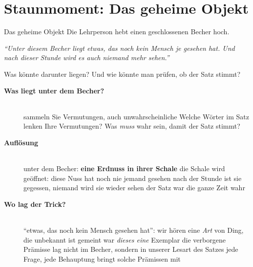 \section{Staunmoment: Das geheime Objekt}
\begin{staunbox}{Das geheime Objekt}
Die Lehrperson hebt einen geschlossenen Becher hoch.

\medskip
\emph{\enquote{Unter diesem Becher liegt etwas, das noch kein Mensch je
gesehen hat. Und nach dieser Stunde wird es auch niemand mehr sehen.}}

\medskip
Was könnte darunter liegen? Und wie könnte man prüfen, ob der Satz
stimmt?
\end{staunbox}
\os{\newpage}

\begin{description}
\item[{\rot\bf Was liegt unter dem Becher?}]~\\[-\lblskip]
\bi
  \ite sammeln Sie Vermutungen, auch unwahrscheinliche
  \ite Welche Wörter im Satz lenken Ihre Vermutungen?
  \ite Was \emph{muss} wahr sein, damit der Satz stimmt?
\ei
{}
\os{\newpage}

\item[{\rot\bf Auflösung}]~\\[-\lblskip]
\bi
  \ite unter dem Becher: \textbf{eine Erdnuss in ihrer Schale}
  \ite die Schale wird geöffnet: diese Nuss hat noch nie jemand gesehen
  \ite nach der Stunde ist sie gegessen, niemand wird sie wieder sehen
  \ite der Satz war die ganze Zeit wahr
\ei
{}
\os{\newpage}

\item[{\rot\bf Wo lag der Trick?}]~\\[-\lblskip]
\bi
  \ite \enquote{etwas, das noch kein Mensch gesehen hat}: wir hören eine
    \emph{Art} von Ding, die unbekannt ist
  \ite gemeint war \emph{dieses eine} Exemplar
  \ite die verborgene Prämisse lag nicht im Becher, sondern in unserer
    Lesart des Satzes
  \ite jede Frage, jede Behauptung bringt solche Prämissen mit
\ei
\os{\newpage}
\end{description}

